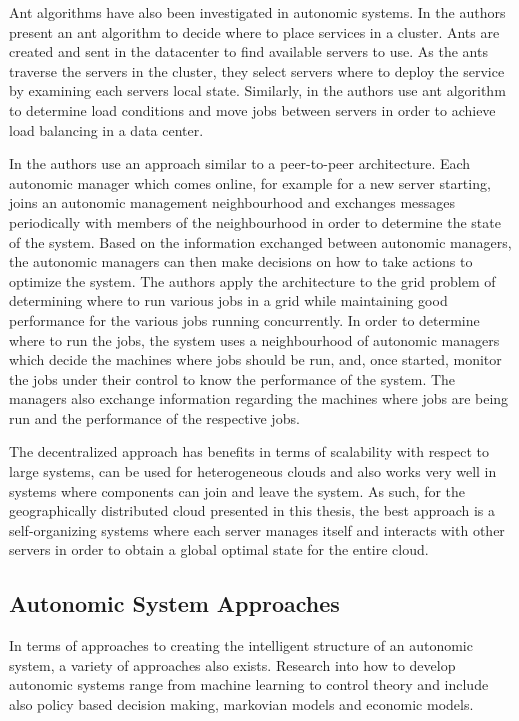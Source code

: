 Ant algorithms have also been investigated in autonomic systems. In \cite{statmechcomplexnetwork} the authors present an ant algorithm to decide where to place services in a cluster. Ants are created and sent in the datacenter to find available servers to use. As the ants traverse the servers in the cluster, they select servers where to deploy the service by examining each servers local state. Similarly, in \cite{messor:loadbalaneants} the authors use ant algorithm to determine load conditions and move jobs between servers in order to achieve load balancing in a data center.

In \cite{decentralized1} the authors use an approach similar to a peer-to-peer architecture. Each autonomic manager which comes online, for example for a new server starting, joins an autonomic management neighbourhood and exchanges messages periodically with members of the neighbourhood in order to determine the state of the system. Based on the information exchanged between autonomic managers, the autonomic managers can then make decisions on how to take actions to optimize the system. The authors apply the architecture to the grid problem of determining where to run various jobs in a grid while maintaining good performance for the various jobs running concurrently. In order to determine where to run the jobs, the system uses a neighbourhood of autonomic managers which decide the machines where jobs should be run, and, once started, monitor the jobs under their control to know the performance of the system. The managers also exchange information regarding the machines where jobs are being run and the performance of the respective jobs.

The decentralized approach has benefits in terms of scalability with respect to large systems, can be used for heterogeneous clouds and also works very well in systems where components can join and leave the system. As such, for the geographically distributed cloud presented in this thesis, the best approach is a self-organizing systems where each server manages itself and interacts with other servers in order to obtain a global optimal state for the entire cloud.

\subsection{Autonomic System Approaches}

In terms of approaches to creating the intelligent structure of an autonomic system, a variety of approaches also exists. Research into how to develop autonomic systems range from machine learning to control theory and include also policy based decision making, markovian models and economic models.

